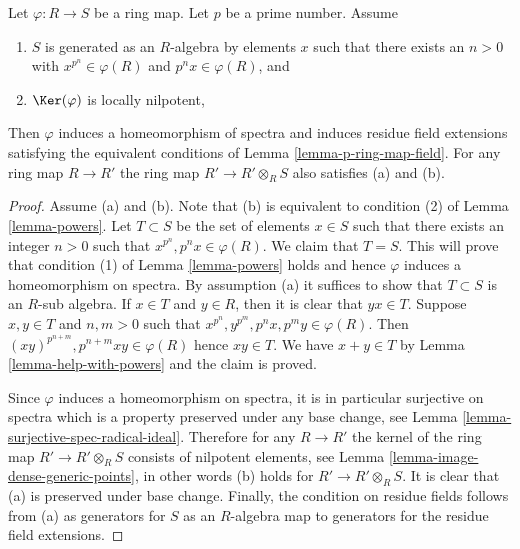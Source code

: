 \begin{lemma}
\label{lemma-p-ring-map}
Let $\varphi : R \to S$ be a ring map. Let $p$ be a prime number. Assume
\begin{enumerate}
\item[(a)] $S$ is generated as an $R$-algebra by elements $x$ such
that there exists an $n > 0$ with $x^{p^n} \in \varphi(R)$ and
$p^nx \in \varphi(R)$, and
\item[(b)] $\Ker(\varphi)$ is locally nilpotent,
\end{enumerate}
Then $\varphi$ induces a homeomorphism of spectra and induces
residue field extensions satisfying the equivalent conditions
of Lemma \ref{lemma-p-ring-map-field}. For any ring map $R \to R'$
the ring map $R' \to R' \otimes_R S$ also satisfies (a) and (b).
\end{lemma}

\begin{proof}
Assume (a) and (b). Note that (b) is equivalent to condition (2)
of Lemma \ref{lemma-powers}. Let $T \subset S$ be the set of
elements $x \in S$ such that there exists an
integer $n > 0$ such that $x^{p^n} , p^n x \in \varphi(R)$.
We claim that $T = S$. This will prove that condition (1) of
Lemma \ref{lemma-powers} holds and hence $\varphi$ induces
a homeomorphism on spectra.
By assumption (a) it suffices to show that $T \subset S$ is an $R$-sub algebra.
If $x \in T$ and $y \in R$, then it is clear that $yx \in T$.
Suppose $x, y \in T$ and $n, m > 0$ such that
$x^{p^n}, y^{p^m}, p^n x, p^m y \in \varphi(R)$.
Then $(xy)^{p^{n + m}}, p^{n + m}xy \in \varphi(R)$
hence $xy \in T$. We have $x + y \in T$ by Lemma \ref{lemma-help-with-powers}
and the claim is proved.

\medskip\noindent
Since $\varphi$ induces a homeomorphism on spectra, it is in particular
surjective on spectra which is a property preserved under any base change, see
Lemma \ref{lemma-surjective-spec-radical-ideal}.
Therefore for any $R \to R'$ the kernel of the ring map
$R' \to R' \otimes_R S$ consists of nilpotent elements, see
Lemma \ref{lemma-image-dense-generic-points},
in other words (b) holds for $R' \to R' \otimes_R S$.
It is clear that (a) is preserved under base change.
Finally, the condition on residue fields follows from (a)
as generators for $S$ as an $R$-algebra map to generators for
the residue field extensions.
\end{proof}
